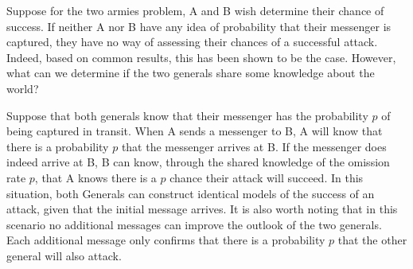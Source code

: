 
Suppose for the two armies problem, A and B wish determine their chance of success.
If neither A nor B have any idea of probability that their messenger is captured, they have no way of assessing their chances of a successful attack.
Indeed, based on common results, this has been shown to be the case.
However, what can we determine if the two generals share some knowledge about the world?

Suppose that both generals know that their messenger has the probability $p$ of being captured in transit.
When A sends a messenger to B, A will know that there is a probability $p$ that the messenger arrives at B.
If the messenger does indeed arrive at B, B can know, through the shared knowledge of the omission rate $p$, that A knows there is a $p$ chance their attack will succeed.
In this situation, both Generals can construct identical models of the success of an attack, given that the initial message arrives.
It is also worth noting that in this scenario no additional messages can improve the outlook of the two generals.
Each additional message only confirms that there is a probability $p$ that the other general will also attack.






